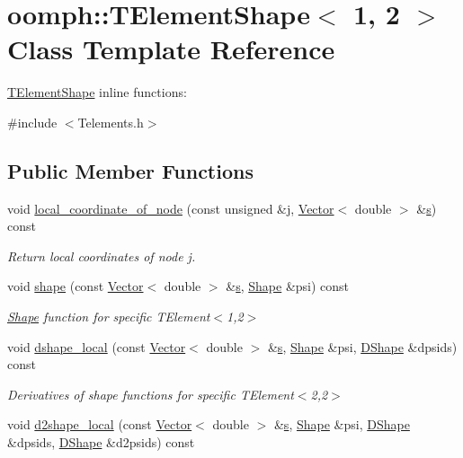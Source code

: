 \hypertarget{classoomph_1_1TElementShape_3_011_00_012_01_4}{}\section{oomph\+:\+:T\+Element\+Shape$<$ 1, 2 $>$ Class Template Reference}
\label{classoomph_1_1TElementShape_3_011_00_012_01_4}


\hyperlink{classoomph_1_1TElementShape}{T\+Element\+Shape} inline functions\+:  




{\ttfamily \#include $<$Telements.\+h$>$}

\subsection*{Public Member Functions}
\begin{DoxyCompactItemize}
\item 
void \hyperlink{classoomph_1_1TElementShape_3_011_00_012_01_4_a2c4eb1303f476287300c0d70144e7378}{local\+\_\+coordinate\+\_\+of\+\_\+node} (const unsigned \&j, \hyperlink{classoomph_1_1Vector}{Vector}$<$ double $>$ \&\hyperlink{cfortran_8h_ab7123126e4885ef647dd9c6e3807a21c}{s}) const
\begin{DoxyCompactList}\small\item\em Return local coordinates of node j. \end{DoxyCompactList}\item 
void \hyperlink{classoomph_1_1TElementShape_3_011_00_012_01_4_a8eab8c5435e8ac796423de96e3b3f688}{shape} (const \hyperlink{classoomph_1_1Vector}{Vector}$<$ double $>$ \&\hyperlink{cfortran_8h_ab7123126e4885ef647dd9c6e3807a21c}{s}, \hyperlink{classoomph_1_1Shape}{Shape} \&psi) const
\begin{DoxyCompactList}\small\item\em \hyperlink{classoomph_1_1Shape}{Shape} function for specific T\+Element$<$1,2$>$ \end{DoxyCompactList}\item 
void \hyperlink{classoomph_1_1TElementShape_3_011_00_012_01_4_a8e49a6b8e66631cd281906d143bba607}{dshape\+\_\+local} (const \hyperlink{classoomph_1_1Vector}{Vector}$<$ double $>$ \&\hyperlink{cfortran_8h_ab7123126e4885ef647dd9c6e3807a21c}{s}, \hyperlink{classoomph_1_1Shape}{Shape} \&psi, \hyperlink{classoomph_1_1DShape}{D\+Shape} \&dpsids) const
\begin{DoxyCompactList}\small\item\em Derivatives of shape functions for specific T\+Element$<$2,2$>$ \end{DoxyCompactList}\item 
void \hyperlink{classoomph_1_1TElementShape_3_011_00_012_01_4_ab539b7d570121e8f4b3eccaf4e1cff79}{d2shape\+\_\+local} (const \hyperlink{classoomph_1_1Vector}{Vector}$<$ double $>$ \&\hyperlink{cfortran_8h_ab7123126e4885ef647dd9c6e3807a21c}{s}, \hyperlink{classoomph_1_1Shape}{Shape} \&psi, \hyperlink{classoomph_1_1DShape}{D\+Shape} \&dpsids, \hyperlink{classoomph_1_1DShape}{D\+Shape} \&d2psids) const
\end{DoxyCompactItemize}


